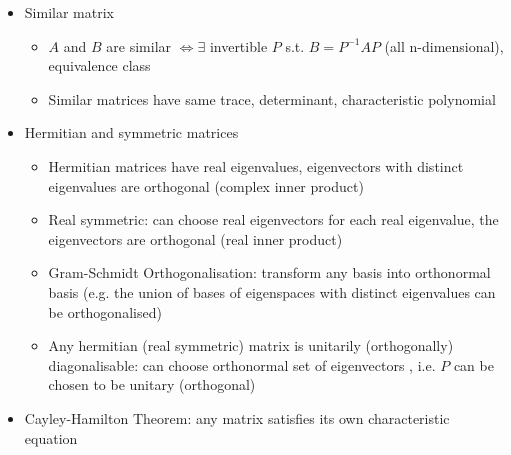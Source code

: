 \begin{itemize}
\begin{itemize}
            \end{itemize}
      \item Similar matrix
            \begin{itemize}
                  \item $A$ and $B$ are similar $\iff\exists$ invertible $P$ s.t. $B=P^{-1}AP$
                        (all n-dimensional), equivalence class
                  \item Similar matrices have same trace, determinant, characteristic polynomial
            \end{itemize}
      \item Hermitian and symmetric matrices
            \begin{itemize}
                  \item Hermitian matrices have real eigenvalues, eigenvectors with distinct
                        eigenvalues are orthogonal (complex inner product)
                  \item Real symmetric: can choose real eigenvectors for each real eigenvalue,
                        the eigenvectors are orthogonal (real inner product)
                  \item Gram-Schmidt Orthogonalisation: transform any basis into orthonormal
                        basis (e.g. the union of bases of eigenspaces with distinct eigenvalues
                        can be orthogonalised)
                  \item Any hermitian (real symmetric) matrix is unitarily (orthogonally)
                        diagonalisable: can choose orthonormal set of eigenvectors , i.e.
                        $P$ can be chosen to be unitary (orthogonal)\\
            \end{itemize}
      \item Cayley-Hamilton Theorem: any matrix satisfies its own characteristic
            equation
\end{itemize}

